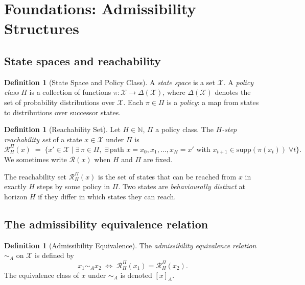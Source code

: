 \documentclass[11pt, a4paper]{article}
\theoremstyle{plain}
\theoremstyle{definition}
\newtheorem{definition}[theorem]{Definition}
\theoremstyle{remark}
\newcommand{\N}{\mathbb{N}}
\newcommand{\calX}{\mathcal{X}}
\newcommand{\calR}{\mathcal{R}}
\newcommand{\simA}{\sim_{\!A}}
\newcommand{\RHP}{\mathcal{R}_{H}^{\Pi}}
\begin{document}
\section{Foundations: Admissibility Structures}
\label{sec:foundations}

\subsection{State spaces and reachability}

\begin{definition}[State Space and Policy Class]
\label{def:state_space}
A \emph{state space} is a set $\calX$. A \emph{policy class} $\Pi$ is a
collection of functions $\pi\colon \calX \to \Delta(\calX)$, where
$\Delta(\calX)$ denotes the set of probability distributions over $\calX$.
Each $\pi \in \Pi$ is a \emph{policy}: a map from states to distributions over
successor states.
\end{definition}

\begin{definition}[Reachability Set]
\label{def:reach}
Let $H \in \N$, $\Pi$ a policy class. The \emph{$H$-step reachability set}
of a state $x \in \calX$ under $\Pi$ is
\[
  \RHP(x) \;=\; \bigl\{x' \in \calX \;\big|\;
    \exists\,\pi \in \Pi,\;\exists\,\text{path }
    x = x_0, x_1, \ldots, x_H = x' \text{ with }
    x_{t+1} \in \mathrm{supp}(\pi(x_t))\;\forall t\bigr\}.
\]
We sometimes write $\calR(x)$ when $H$ and $\Pi$ are fixed.
\end{definition}

The reachability set $\RHP(x)$ is the set of states that can be reached from
$x$ in exactly $H$ steps by some policy in $\Pi$. Two states are
\emph{behaviourally distinct} at horizon $H$ if they differ in which states
they can reach.

\subsection{The admissibility equivalence relation}

\begin{definition}[Admissibility Equivalence]
\label{def:admissibility_eq}
The \emph{admissibility equivalence relation} $\simA$ on $\calX$ is defined by
\[
  x_1 \simA x_2 \;\iff\; \RHP(x_1) = \RHP(x_2).
\]
The equivalence class of $x$ under $\simA$ is denoted $[x]_A$.
\end{definition}
\end{document}
